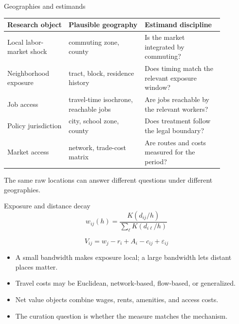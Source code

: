 \documentclass[aspectratio=169,11pt]{beamer}
\newcommand{\1}{\mathbf{1}}
\begin{document}
\begin{frame}{Geographies and estimands}
\small
\begin{tabular}{p{0.25\linewidth} p{0.31\linewidth} p{0.32\linewidth}}
\toprule
Research object & Plausible geography & Estimand discipline \\
\midrule
Local labor-market shock & commuting zone, county & Is the market integrated by commuting? \\
Neighborhood exposure & tract, block, residence history & Does timing match the relevant exposure window? \\
Job access & travel-time isochrone, reachable jobs & Are jobs reachable by the relevant workers? \\
Policy jurisdiction & city, school zone, county & Does treatment follow the legal boundary? \\
Market access & network, trade-cost matrix & Are routes and costs measured for the period? \\
\bottomrule
\end{tabular}

\medskip
The same raw locations can answer different questions under different geographies.
\end{frame}

\begin{frame}{Exposure and distance decay}
\small
\[
w_{ij}(h)=
\frac{K(d_{ij}/h)}
{\sum_{\ell}K(d_{i\ell}/h)}
\]

\[
V_{ij}=w_j-r_i+A_i-c_{ij}+\varepsilon_{ij}
\]

\begin{itemize}
    \item A small bandwidth makes exposure local; a large bandwidth lets distant places matter.
    \item Travel costs may be Euclidean, network-based, flow-based, or generalized.
    \item Net value objects combine wages, rents, amenities, and access costs.
    \item The curation question is whether the measure matches the mechanism.
\end{itemize}
\end{frame}
\end{document}
